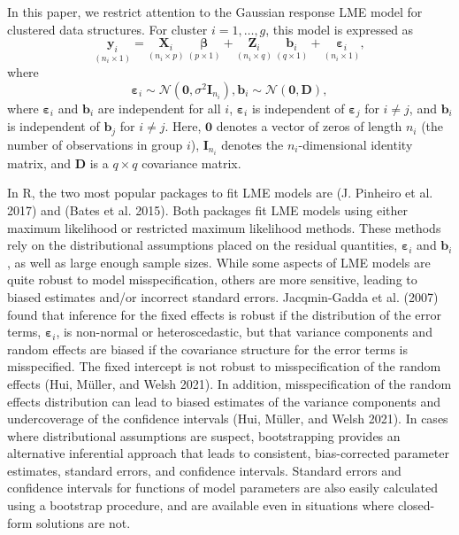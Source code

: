 In this paper, we restrict attention to the Gaussian response LME model for clustered data structures. For cluster
\(i=1, \ldots, g\), this model is expressed as
\begin{equation}
    \underset{(n_i \times 1)}{\boldsymbol{y}_i} = \underset{(n_i \times p)}{\boldsymbol{X}_i} \ \underset{(p \times 1)}{\boldsymbol{\beta}} + \underset{(n_i \times q)}{\boldsymbol{Z}_i} \ \underset{(q \times 1)}{\boldsymbol{b}_i} + \underset{(n_i \times 1)}{\boldsymbol{\varepsilon}_i},
    \label{eq:lme}
\end{equation}
where
\begin{equation}
\boldsymbol{\varepsilon}_i \sim \mathcal{N}(\boldsymbol{0}, \sigma^2 \boldsymbol{I}_{n_i}),   \boldsymbol{b}_i \sim \mathcal{N}(\boldsymbol{0}, \boldsymbol{D}),
\label{eq:dsns}
\end{equation}
where \(\boldsymbol{\varepsilon}_i\) and \(\boldsymbol{b}_i\) are independent for all \(i\), \(\boldsymbol{\varepsilon}_i\) is independent of \(\boldsymbol{\varepsilon}_j\) for \(i\ne j\), and \(\boldsymbol{b}_i\) is independent of \(\boldsymbol{b}_j\) for \(i\ne j\). Here, \(\boldsymbol{0}\) denotes a vector of zeros of length \(n_i\) (the number of observations in group \(i\)), \(\boldsymbol{I}_{n_i}\) denotes the \(n_i\)-dimensional identity matrix,
and \(\boldsymbol{D}\) is a \(q \times q\) covariance matrix.

In R, the two most popular packages to fit LME models are  (J. Pinheiro et al. 2017) and  (Bates et al. 2015). Both packages fit LME models using either maximum likelihood or restricted maximum likelihood methods. These methods rely on the distributional assumptions placed on the residual quantities, \(\boldsymbol{\varepsilon}_i\) and \(\boldsymbol{b}_i\), as well as large enough sample sizes. While some aspects of LME models are quite robust to model misspecification, others are more sensitive, leading to biased estimates and/or incorrect standard errors. Jacqmin-Gadda et al. (2007) found that inference for the fixed effects is robust if the distribution of the error terms, \(\boldsymbol{\varepsilon}_i\), is non-normal or heteroscedastic, but that variance components and random effects are biased if the covariance structure for the error terms is misspecified. The fixed intercept is not robust to misspecification of the random effects (Hui, Müller, and Welsh 2021). In addition, misspecification of the random effects distribution can lead to biased estimates of the variance components and undercoverage of the confidence intervals (Hui, Müller, and Welsh 2021). In cases where distributional assumptions are suspect, bootstrapping provides an alternative inferential approach that leads to consistent, bias-corrected parameter estimates, standard errors, and confidence intervals. Standard errors and confidence intervals for functions of model parameters are also easily calculated using a bootstrap procedure, and are available even in situations where closed-form solutions are not.


